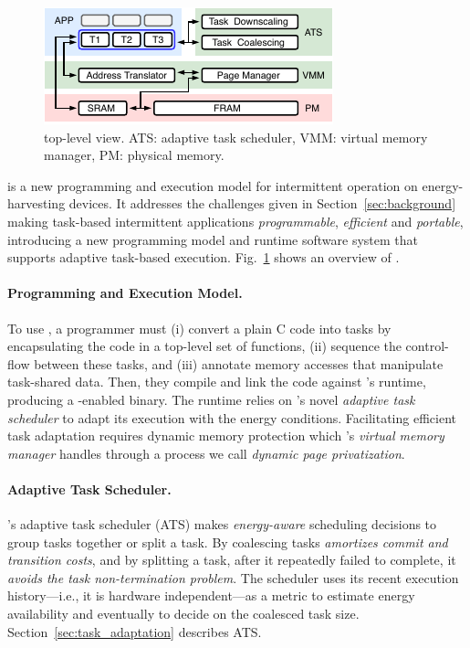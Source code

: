 \begin{figure}
	\centering
	\includegraphics[width=\columnwidth]{figures/system-overview.pdf}
	\caption{\sys top-level view. ATS: adaptive task scheduler, VMM: virtual memory manager, PM: physical memory.}
	\label{fig:system_overview}
\end{figure}

\sys is a new programming and execution model for intermittent operation on energy-harvesting devices. It addresses the challenges given in Section~\ref{sec:background} making task-based intermittent applications {\em programmable}, {\em efficient} and {\em portable}, introducing a new programming model and runtime software system that supports adaptive task-based execution. Fig.~\ref{fig:system_overview} shows an overview of \sys.

\paragraph{Programming and Execution Model.}
To use \sys, a programmer must (i) convert a plain C code into tasks by encapsulating the code in a top-level set of functions, (ii) sequence the control-flow between these tasks, and (iii) annotate memory accesses that manipulate task-shared data. Then, they compile and link the code against \sys's runtime, producing a \sys-enabled binary. The runtime relies on \sys's novel {\em adaptive task scheduler} to adapt its execution with the energy conditions. Facilitating efficient task adaptation requires dynamic memory protection which \sys's \emph{virtual memory manager} handles through a process we call \emph{dynamic page privatization}. 

\paragraph{Adaptive Task Scheduler.}
\sys's adaptive task scheduler (ATS) makes \emph{energy-aware} scheduling decisions to group tasks together or split a task. By coalescing tasks \sys \emph{amortizes commit and transition costs}, and by splitting a task, after it repeatedly failed to complete, it \emph{avoids the task non-termination problem}. The scheduler uses its recent execution history---i.e., it is hardware independent---as a metric to estimate energy availability and eventually to decide on the coalesced task size. Section~\ref{sec:task_adaptation} describes ATS.

